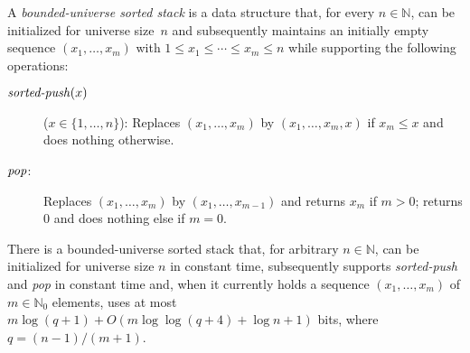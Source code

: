 \documentclass[envcountsame,envcountsect,undated,nolinenumbers]{lnthi}
\def\Tvn#1{\hbox{\textit{#1\/}}}
\def\TbbbN{\mathbb{N}}
\begin{document}
\begin{definition}
A \emph{bounded-universe sorted stack} is a data structure that,
for every $n\in\TbbbN$, can be
initialized for universe size~$n$ and
subsequently maintains an initially empty
sequence $(x_1,\ldots,x_m)$ with
$1\le x_1\le\cdots\le x_m\le n$ while supporting
the following operations:

\begin{description}
\item[\normalfont$\Tvn{sorted-push}(x)$]
($x\in\{1,\ldots,n\}$):
Replaces $(x_1,\ldots,x_m)$ by $(x_1,\ldots,x_m,x)$
if $x_m\le x$ and does nothing otherwise.
\item[\normalfont$\Tvn{pop}$:]
Replaces $(x_1,\ldots,x_m)$ by $(x_1,\ldots,x_{m-1})$
and returns $x_m$ if $m>0$; returns 0 and
does nothing else if $m=0$.
\end{description}
\end{definition}

\begin{lemma}
\label{lem:stack}There is a bounded-universe
sorted stack that, for arbitrary $n\in\TbbbN$,
can be initialized for universe size $n$ in constant time,
subsequently
supports \Tvn{sorted-push} and \Tvn{pop} in constant
time and, when it currently holds a sequence
$(x_1,\ldots,x_m)$ of $m\in\TbbbN_0$ elements, uses at most
$m\log(q+1)+O(m\log\log(q+4)+\log n+1)$
bits, where $q={{(n-1)}/{(m+1)}}$. 
\end{lemma}
\end{document}
